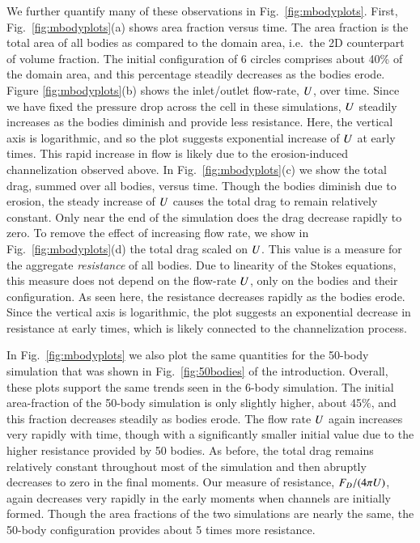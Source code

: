 \documentclass[preprint, 10pt]{elsarticle}
\begin{document}
We further quantify many of these observations in Fig.~\ref{fig:mbodyplots}. First, Fig.~\ref{fig:mbodyplots}(a) shows area fraction versus time. The area fraction is the total area of all bodies as compared to the domain area, i.e.~the 2D counterpart of volume fraction. The initial configuration of 6 circles comprises about 40\% of the domain area, and this percentage steadily decreases as the bodies erode. Figure \ref{fig:mbodyplots}(b) shows the inlet/outlet flow-rate, $U$, over time. Since we have fixed the pressure drop across the cell in these simulations, $U$ steadily increases as the bodies diminish and provide less resistance. Here, the vertical axis is logarithmic, and so the plot suggests exponential increase of $U$ at early times. This rapid increase in flow is likely due to the erosion-induced channelization observed above. In Fig.~\ref{fig:mbodyplots}(c) we show the total drag, summed over all bodies, versus time. Though the bodies diminish due to erosion, the steady increase of $U$ causes the total drag to remain relatively constant. Only near the end of the simulation does the drag decrease rapidly to zero. To remove the effect of increasing flow rate, we show in Fig.~\ref{fig:mbodyplots}(d) the total drag scaled on $U$. This value is a measure for the aggregate {\em resistance} of all bodies. Due to linearity of the Stokes equations, this measure does not depend on the flow-rate $U$, only on the bodies and their configuration. As seen here, the resistance decreases rapidly as the bodies erode. Since the vertical axis is logarithmic, the plot suggests an exponential decrease in resistance at early times, which is likely connected to the channelization process.

In Fig.~\ref{fig:mbodyplots} we also plot the same quantities for the 50-body simulation that was shown in Fig.~\ref{fig:50bodies} of the introduction. Overall, these plots support the same trends seen in the 6-body simulation. The initial area-fraction of the 50-body simulation is only slightly higher, about 45\%, and this fraction decreases steadily as bodies erode. The flow rate $U$ again increases very rapidly with time, though with a significantly smaller initial value due to the higher resistance provided by 50 bodies. As before, the total drag remains relatively constant throughout most of the simulation and then abruptly decreases to zero in the final moments. Our measure of resistance, $F_D/(4 \pi U)$, again decreases very rapidly in the early moments when channels are initially formed. Though the area fractions of the two simulations are nearly the same, the 50-body configuration provides about 5 times more resistance.
\end{document}
